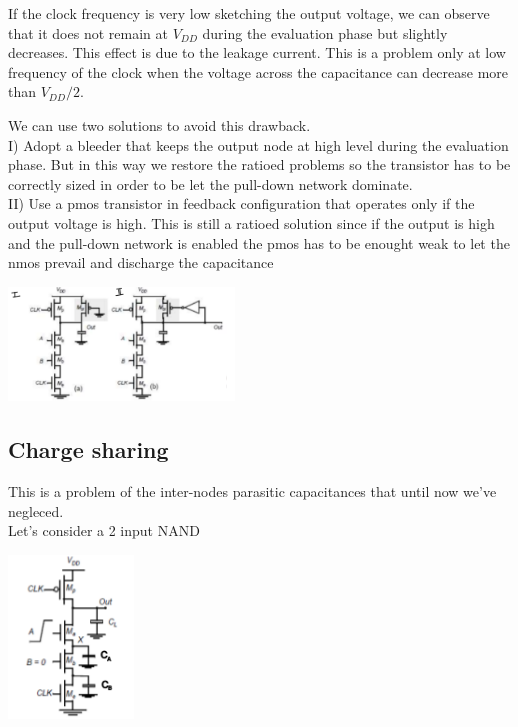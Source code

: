 If the clock frequency is very low sketching the output voltage, we can observe that it does not remain at $V_{DD}$ during the evaluation phase but slightly decreases. This effect is due to the leakage current.
This is a problem only at low frequency of the clock when the voltage across the capacitance can decrease more than $V_{DD}/2$.\\
\vspace{5mm}

We can use two solutions to avoid this drawback.\\
\tab I) Adopt a bleeder that keeps the output node at high level during the evaluation phase. But in this way we restore the ratioed problems so the transistor has to be correctly sized in order to be let the pull-down network dominate.\\
\tab II) Use a pmos transistor in feedback configuration that operates only if the output voltage is high. This is still a ratioed solution since if the output is high and the pull-down network is enabled the pmos has to be enought weak to let the nmos prevail and discharge the capacitance

\centering
\includegraphics[width=0.45\textwidth]{C9_3.png}\\
\raggedright


\subsection{Charge sharing}
This is a problem of the inter-nodes parasitic capacitances that until now we've negleced.\\
Let's consider a 2 input NAND

\centering
\includegraphics[width=0.25\textwidth]{C9_4.png}\\
\raggedright

